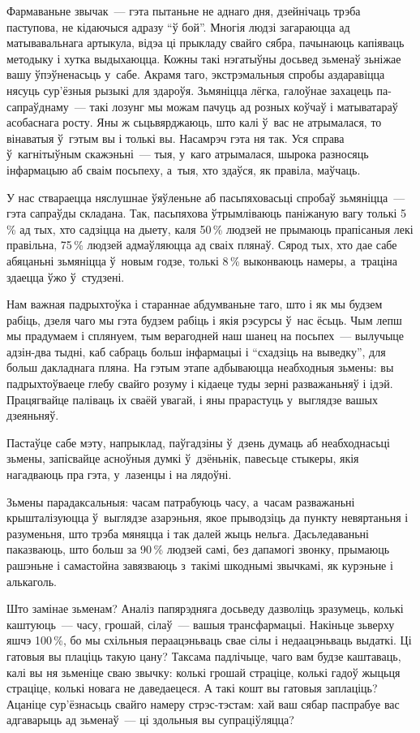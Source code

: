 Фармаваньне звычак~--- гэта пытаньне не аднаго дня, дзейнічаць трэба паступова, не кідаючыся адразу ``ў бой''. Многія людзі загараюцца ад матывавальнага артыкула, відэа ці прыкладу свайго сябра, пачынаюць капіяваць методыку і хутка выдыхаюцца. Кожны такі нэгатыўны досьвед зьменаў зьніжае вашу ўпэўненасьць у~сабе. Акрамя таго, экстрэмальныя спробы аздаравіцца нясуць сур'ёзныя рызыкі для здароўя. Зьмяніцца лёгка, галоўнае захацець па-сапраўднаму~--- такі лозунг мы можам пачуць ад розных коўчаў і матыватараў асобаснага росту. Яны ж сьцьвярджаюць, што калі ў~вас не атрымалася, то вінаватыя ў~гэтым вы і толькі вы. Насамрэч гэта ня так. Уся справа ў~кагнітыўным скажэньні~--- тыя, у~каго атрымалася, шырока разносяць інфармацыю аб сваім посьпеху, а~тыя, хто здаўся, як правіла, маўчаць.

У нас ствараецца няслушнае ўяўленьне аб пасьпяховасьці спробаў зьмяніцца~--- гэта сапраўды складана. Так, пасьпяхова ўтрымліваюць паніжаную вагу толькі 5\,\% ад тых, хто садзіцца на дыету, каля 50\,\% людзей не прымаюць прапісаныя лекі правільна, 75\,\% людзей адмаўляюцца ад сваіх плянаў. Сярод тых, хто дае сабе абяцаньні зьмяніцца ў~новым годзе, толькі 8\,\% выконваюць намеры, а~траціна здаецца ўжо ў~студзені.

Нам важная падрыхтоўка і стараннае абдумваньне таго, што і як мы будзем рабіць, дзеля чаго мы гэта будзем рабіць і якія рэсурсы ў~нас ёсьць. Чым лепш мы прадумаем і сплянуем, тым верагодней наш шанец на посьпех~--- вылучыце адзін-два тыдні, каб сабраць больш інфармацыі і ``схадзіць на выведку'', для больш дакладнага пляна. На гэтым этапе адбываюцца неабходныя зьмены: вы падрыхтоўваеце глебу свайго розуму і кідаеце туды зерні разважаньняў і ідэй. Працягвайце паліваць іх сваёй увагай, і яны прарастуць у~выглядзе вашых дзеяньняў.

Пастаўце сабе мэту, напрыклад, паўгадзіны ў~дзень думаць аб неабходнасьці зьмены, запісвайце асноўныя думкі ў~дзёньнік, павесьце стыкеры, якія нагадваюць пра гэта, у~лазенцы і на лядоўні.

Зьмены парадаксальныя: часам патрабуюць часу, а~часам разважаньні крышталізуюцца ў~выглядзе азарэньня, якое прыводзіць да пункту невяртаньня і разуменьня, што трэба мяняцца і так далей жыць нельга. Дасьледаваньні паказваюць, што больш за 90\,\% людзей самі, без дапамогі звонку, прымаюць рашэньне і самастойна завязваюць з~такімі шкоднымі звычкамі, як курэньне і алькаголь. 

Што замінае зьменам? Аналіз папярэдняга досьведу дазволіць зразумець, колькі каштуюць~--- часу, грошай, сілаў~--- вашыя трансфармацыі. Накіньце зьверху яшчэ 100\,\%, бо мы схільныя пераацэньваць свае сілы і недаацэньваць выдаткі. Ці гатовыя вы плаціць такую цану? Таксама падлічыце, чаго вам будзе каштаваць, калі вы ня зьменіце сваю звычку: колькі грошай страціце, колькі гадоў жыцьця страціце, колькі новага не даведаецеся. А такі кошт вы гатовыя заплаціць? Ацаніце сур'ёзнасьць свайго намеру стрэс-тэстам: хай ваш сябар паспрабуе вас адгаварыць ад зьменаў~--- ці здольныя вы супраціўляцца? 

